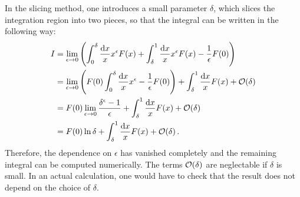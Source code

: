 In the slicing method, one introduces a small parameter $\delta$, which slices the integration region into two pieces, so that the integral can be written in the following way:
%
\begin{align}
	I 	&= \lim_{\epsilon \rightarrow 0} \left( \int_0^\delta \frac{\dif x}{x} x^\epsilon F(x) + \int_\delta^1 \frac{\dif x}{x} x^\epsilon F(x) - \frac{1}{\epsilon} F(0) \right) \nonumber \\
		&= \lim_{\epsilon \rightarrow 0} \left( F(0) \int_0^\delta \frac{\dif x}{x} x^\epsilon - \frac{1}{\epsilon} F(0) \right) + \int_\delta^1 \frac{\dif x}{x} F(x) + \order{\delta} \nonumber \\
		&= F(0) \lim_{\epsilon \rightarrow 0} \frac{\delta^\epsilon - 1}{\epsilon} + \int_\delta^1 \frac{\dif x}{x} F(x) + \order{\delta} \nonumber \\
		&= F(0) \ln \delta + \int_\delta^1 \frac{\dif x}{x} F(x) + \order{\delta} \, .
\end{align}
%
Therefore, the dependence on $\epsilon$ has vanished completely and the remaining integral can be computed numerically.
The terms $\operatorname{\mathcal{O}}(\delta)$ are neglectable if $\delta$ is small.
In an actual calculation, one would have to check that the result does not depend on the choice of $\delta$.

